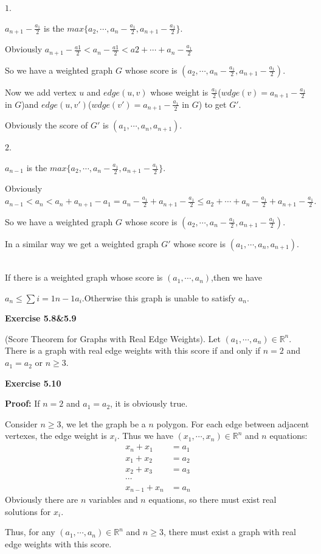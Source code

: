 \documentclass{article} %
\begin{document}
        $1.$\par
        $a_{n+1}-\frac{a_1}{2}$ is the $max\{a_2,\cdots,a_n-\frac{a_1}{2},a_{n+1}-\frac{a_1}{2}\}$.\par
        Obviously $a_{n+1}-\frac{a1}{2}<a_n-\frac{a1}{2}<a2+\cdots+a_n-\frac{a_1}{2}$\par
        So we have a weighted graph $G$ whose score is $(a_2,\cdots,a_n-\frac{a_1}{2},a_{n+1}-\frac{a_1}{2})$.\par
        Now we add vertex $u$ and $edge(u,v)$ whose weight is $\frac{a_1}{2}$($wdge(v)=a_{n+1}-\frac{a_1}{2}$ in $G$)and $edge(u,v\prime)$($wdge(v\prime)=a_{n+1}-\frac{a_1}{2}$ in $G$) to get $G\prime$.\par
        Obviously the score of $G\prime$ is $(a_1,\cdots,a_n,a_{n+1})$.\par
        $2.$\par
        $a_{n-1}$ is the $max\{a_2,\cdots,a_n-\frac{a_1}{2},a_{n+1}-\frac{a_1}{2}\}$.\par
        Obviously $a_{n-1}<a_n<a_n+a_{n+1}-a_1=a_n-\frac{a_1}{2}+a_{n+1}-\frac{a_1}{2}\leq a_2+\cdots+a_n-\frac{a_1}{2}+a_{n+1}-\frac{a_1}{2}.$\par
        So we have a weighted graph $G$ whose score is $(a_2,\cdots,a_n-\frac{a_1}{2},a_{n+1}-\frac{a_1}{2})$.\par
        In a similar way we get a weighted graph $G\prime$ whose score is $(a_1,\cdots,a_n,a_{n+1})$.\par
        ~\\
        If there is a weighted graph whose score is $(a_1,\cdots,a_n)$,then we have\par
        $a_n\leq\sum{i=1}{n-1}a_i.$Otherwise this graph is unable to satisfy $a_n$.
        

	
	

\textbf{Exercise 5.8\&5.9}\par
	(Score Theorem for Graphs with Real Edge Weights). Let $(a_1,\cdots, a_n)\in\mathbb{R}^n$. 
	There is a graph with real edge weights with this score if and only if $n=2$ and $a_1=a_2$ or $n\ge 3$.
	 
\textbf{Exercise 5.10}\par
	\textbf{Proof:}
	If $n=2$ and $a_1=a_2$, it is obviously true.\par
	Consider $n\ge 3$, we let the graph be a $n$ polygon. For each edge between adjacent vertexes, the edge weight is $x_i$. 
	Thus we have $(x_1,\cdots, x_n)\in\mathbb{R}^n$ and  $n$ equations:
	\begin{align*}
	x_{n}+x_1&=a_1\\
	x_1+x_2&=a_2\\
	x_2+x_3&=a_3\\
	\cdots\\
	x_{n-1}+x_{n}&=a_{n}
	\end{align*}
	Obviously there are $n$ variables and $n$ equations, so there must exist real solutions for $x_i$.\par
	Thus, for any $(a_1,\cdots, a_n)\in\mathbb{R}^n$ and $n\ge 3$, there must exist a graph with real edge weights with this score.
\end{document}
